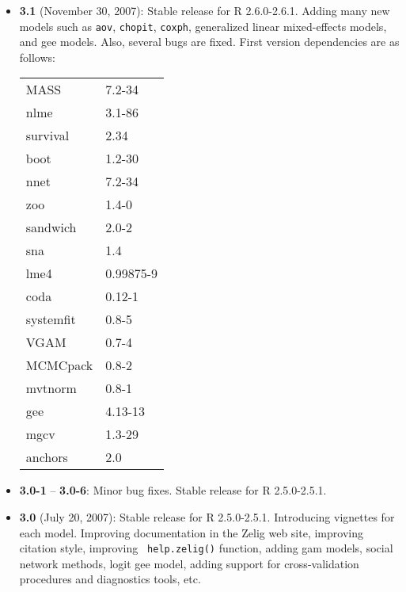 \begin{itemize} 
  
\item {\bf 3.1} (November 30, 2007): Stable release for R 2.6.0-2.6.1.
  Adding many new models such as {\tt aov}, {\tt chopit}, {\tt coxph}, generalized linear mixed-effects models, and gee models.  Also, several bugs are
  fixed.  First version dependencies are as follows:\newline
\begin{tabular}{ll}\label{table.compat}
MASS      & 7.2-34 \\
nlme      & 3.1-86 \\
survival  & 2.34 \\
boot      & 1.2-30 \\
nnet      & 7.2-34 \\
zoo       & 1.4-0 \\
sandwich  & 2.0-2 \\
sna       & 1.4 \\
lme4      & 0.99875-9 \\
coda      & 0.12-1 \\
systemfit & 0.8-5 \\
VGAM      & 0.7-4 \\
MCMCpack  & 0.8-2 \\
mvtnorm   & 0.8-1 \\
gee       & 4.13-13 \\
mgcv      & 1.3-29 \\
anchors   & 2.0 
\end{tabular}

\item {\bf 3.0-1} -- {\bf 3.0-6}: Minor bug fixes. Stable release for
  R 2.5.0-2.5.1.

\item {\bf 3.0} (July 20, 2007): Stable release for R 2.5.0-2.5.1.
  Introducing vignettes for each model. Improving documentation in the
  Zelig web site, improving citation style, improving {\tt
    help.zelig()} function, adding gam models, social network methods,
  logit gee model, adding support for cross-validation procedures and
  diagnostics tools, etc.


\end{itemize}
